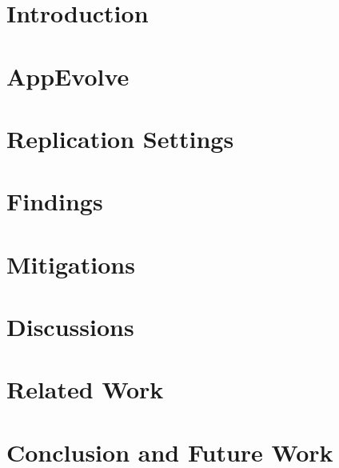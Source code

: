 \documentclass[conference]{IEEEtran}
\begin{document}
\section{Introduction}


\section{AppEvolve}\label{sec:approach}


\section{Replication Settings}\label{sec:replication}


\section{Findings}\label{sec:findings}


\section{Mitigations}\label{sec:mitigations}


\section{Discussions}\label{sec:discuss}


\section{Related Work}\label{sec:related}


\section{Conclusion and Future Work}\label{sec:conclusion}



{}

\end{document}
